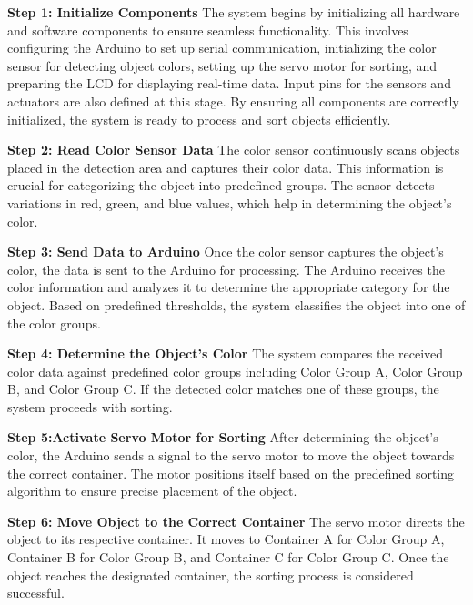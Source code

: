 \documentclass[conference, onecolumn]{IEEEtran}
\begin{document}
\textbf{Step 1: Initialize Components}  
The system begins by initializing all hardware and software components to ensure seamless functionality. This involves configuring the Arduino to set up serial communication, initializing the color sensor for detecting object colors, setting up the servo motor for sorting, and preparing the LCD for displaying real-time data. Input pins for the sensors and actuators are also defined at this stage. By ensuring all components are correctly initialized, the system is ready to process and sort objects efficiently.

\vspace{0.5cm}
\noindent

\textbf{Step 2: Read Color Sensor Data}  
The color sensor continuously scans objects placed in the detection area and captures their color data. This information is crucial for categorizing the object into predefined groups. The sensor detects variations in red, green, and blue values, which help in determining the object's color.

\vspace{0.5cm}
\noindent

\textbf{Step 3: Send Data to Arduino}  
Once the color sensor captures the object’s color, the data is sent to the Arduino for processing. The Arduino receives the color information and analyzes it to determine the appropriate category for the object. Based on predefined thresholds, the system classifies the object into one of the color groups.

\vspace{0.5cm}
\noindent


\textbf{Step 4: Determine the Object's Color}  
The system compares the received color data against predefined color groups including Color Group A, Color Group B, and Color Group C. If the detected color matches one of these groups, the system proceeds with sorting.

\vspace{0.5cm}
\noindent


\textbf{Step 5:Activate Servo Motor for Sorting}  
After determining the object's color, the Arduino sends a signal to the servo motor to move the object towards the correct container. The motor positions itself based on the predefined sorting algorithm to ensure precise placement of the object.

\vspace{0.5cm}
\noindent

\textbf{Step 6: Move Object to the Correct Container}  
The servo motor directs the object to its respective container. It moves to Container A for Color Group A, Container B for Color Group B, and Container C for Color Group C. Once the object reaches the designated container, the sorting process is considered successful.
\vspace{0.5cm}
\noindent
\end{document}
